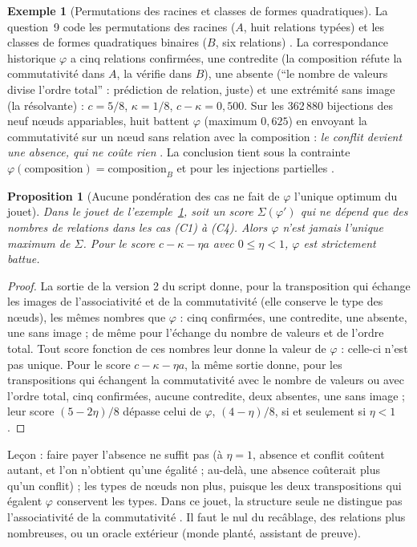\documentclass[11pt,a4paper]{article}
\theoremstyle{definition}
\newtheorem{exemple}[definition]{Exemple}
\theoremstyle{plain}
\newtheorem{proposition}[definition]{Proposition}
\begin{document}
\begin{exemple}[Permutations des racines et classes de formes quadratiques]
\label{ex:jouet}
La question~9 code les permutations des racines ($A$, huit relations typées) et les classes de
formes quadratiques binaires ($B$, six relations) \cite[section~3]{q9}. La correspondance
historique $\varphi$ a cinq relations confirmées, une contredite (la composition réfute la
commutativité dans $A$, la vérifie dans $B$), une absente (\enquote{le nombre de valeurs divise
l'ordre total} : prédiction de relation, juste) et une extrémité sans image (la résolvante) :
$c=5/8$, $\kappa=1/8$, $c-\kappa=0{,}500$. Sur les 362\,880 bijections des neuf nœuds appariables,
huit battent $\varphi$ (maximum $0{,}625$) en envoyant la commutativité sur un nœud sans relation
avec la composition : \emph{le conflit devient une absence, qui ne coûte rien}
\cite[section~5]{q9}. La conclusion tient sous la contrainte $\varphi(\text{composition})=
\text{composition}_B$ et pour les injections partielles \cite[mineur~1]{erratumq9}.
\end{exemple}

\begin{proposition}[Aucune pondération des cas ne fait de $\varphi$ l'unique optimum du jouet]
\label{prop:jouet}
Dans le jouet de l'exemple~\ref{ex:jouet}, soit un score $\Sigma(\varphi')$ qui ne dépend que des
nombres de relations dans les cas (C1) à (C4). Alors $\varphi$ n'est jamais l'unique maximum de
$\Sigma$. Pour le score $c-\kappa-\eta a$ avec $0\le\eta<1$, $\varphi$ est strictement battue.
\end{proposition}
\begin{proof}
La sortie de la version 2 du script \cite[section~2]{sortieq9v2} donne, pour la transposition qui
échange les images de l'associativité et de la commutativité (elle conserve le type des nœuds),
les mêmes nombres que $\varphi$ : cinq confirmées, une contredite, une absente, une sans image ; de
même pour l'échange du nombre de valeurs et de l'ordre total. Tout score fonction de ces nombres
leur donne la valeur de $\varphi$ : celle-ci n'est pas unique. Pour le score
$c-\kappa-\eta a$, la même sortie donne, pour les transpositions qui échangent la commutativité
avec le nombre de valeurs ou avec l'ordre total, cinq confirmées, aucune contredite, deux absentes,
une sans image ; leur score $(5-2\eta)/8$ dépasse celui de $\varphi$, $(4-\eta)/8$, si et seulement
si $\eta<1$.
\end{proof}

Leçon : faire payer l'absence ne suffit pas (à $\eta=1$, absence et conflit coûtent autant, et
l'on n'obtient qu'une égalité ; au-delà, une absence coûterait plus qu'un conflit) ; les types de nœuds non plus, puisque les deux transpositions
qui égalent $\varphi$ conservent les types. Dans ce jouet, la structure seule ne distingue pas
l'associativité de la commutativité \cite[section~5]{q9}. Il faut le nul du recâblage, des relations
plus nombreuses, ou un oracle extérieur (monde planté, assistant de preuve).
\end{document}
